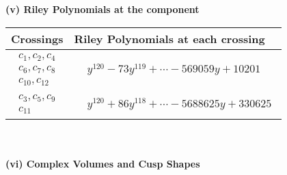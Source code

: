 \documentclass[1p]{elsarticle_modified}
\theoremstyle{definition}
\begin{document}
\newpage\renewcommand{\arraystretch}{1}
\flushleft \textbf{(v) Riley Polynomials at the component}\newline \\
\begin{tabular}{m{50pt}|m{274pt}}
Crossings & \hspace{64pt}Riley Polynomials at each crossing \\
\hline $$\begin{aligned}c_{1},c_{2},c_{4}\\c_{6},c_{7},c_{8}\\c_{10},c_{12}\end{aligned}$$&$\begin{aligned}
&y^{120}-73 y^{119}+\cdots-569059 y+10201
\end{aligned}$\\
\hline $$\begin{aligned}c_{3},c_{5},c_{9}\\c_{11}\end{aligned}$$&$\begin{aligned}
&y^{120}+86 y^{118}+\cdots-5688625 y+330625
\end{aligned}$\\
\hline
\end{tabular}\\~\\
\newpage\flushleft \textbf{(vi) Complex Volumes and Cusp Shapes}
\end{document}
